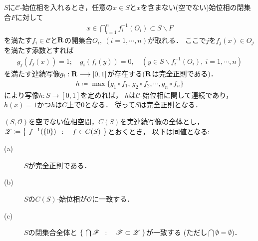 	\begin{prf}
		$S$に$\mathscr{C}$-始位相を入れるとき，任意の$x \in S$と$x$を含まない(空でない)始位相の閉集合$F$に対して
		\begin{align}
			x \in \bigcap_{i=1}^n f_i^{-1}(O_i) \subset S \backslash F
		\end{align}
		を満たす$f_i \in \mathscr{C}$と$\mathbf{R}$の開集合$O_i,\ (i=1,\cdots,n)$が取れる．
		ここで$j$を$f_j(x) \in O_j$を満たす添数とすれば
		\begin{align}
			g_j(f_j(x)) = 1;\quad g_i(f_i(y)) = 0,\quad (y \in S \backslash f_i^{-1}(O_i),
			\ i=1,\cdots,n)
		\end{align}
		を満たす連続写像$g_i:\mathbf{R} \longrightarrow [0,1]$が存在する($\mathbf{R}$は完全正則である)．
		\begin{align}
			h \coloneqq \operatorname{max}\{g_1 \circ f_1,\, g_2 \circ f_2,\cdots,g_n \circ f_n\}
		\end{align}
		により写像$h:S \longrightarrow [0,1]$を定めれば，
		$h$は$\mathscr{C}$-始位相に関して連続であり，
		$h(x)=1$かつ$h$は$C$上で$0$となる．
		従って$S$は完全正則となる．
		\QED
	\end{prf}
	
	\begin{screen}
		\begin{thm}[完全正則空間の位相は実連続写像全体の始位相に一致する]
			$(S,\mathscr{O})$を空でない位相空間，$C(S)$を実連続写像の全体とし，
			$\mathscr{Z} \coloneqq \left\{\ f^{-1}(\{0\})\ \, : \quad f \in C(S)\ \right\}$とおくとき，
			以下は同値となる:
			\begin{description}
				\item[(a)] $S$が完全正則である．
				\item[(b)] $S$の$C(S)$-始位相が$\mathscr{O}$に一致する．
				\item[(c)] $S$の閉集合全体と
					$\left\{\ \bigcap \mathscr{F}\ \, : \quad \mathscr{F} \subset \mathscr{Z}\ \right\}$が一致する
					(ただし$\bigcap \emptyset = \emptyset$)．
			\end{description}
		\end{thm}
	\end{screen}
		

